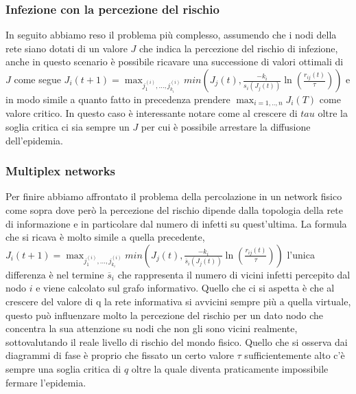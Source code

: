 \subsubsection{Infezione con la percezione del rischio}\label{subsubsec:infezione-con-la-percezione-del-rischio}
In seguito abbiamo reso il problema più complesso, assumendo che i nodi della rete siano dotati di 
un valore $J$ che indica la percezione del rischio di infezione, anche in questo scenario è possibile 
ricavare una successione di valori ottimali di $J$ come segue $J_{i}(t+1)=\max_{j^{(i)}_{1},...,j^{(i)}_{k_{i}}}min(J_{j}(t),\frac{-k_{i}}{s_{i}(J_{j}(t))}\ln(\frac{r_{ij}(t)}{\tau}))$ 
e in modo simile a quanto fatto in precedenza prendere $\max_{i= 1,..,n}J_{i}(T)$ come valore critico.
In questo caso è interessante notare come al crescere di $tau$ oltre la soglia critica ci sia sempre un 
$J$ per cui è possibile arrestare la diffusione dell'epidemia.
\subsubsection{Multiplex networks}\label{subsubsec:multiplex-networks}
Per finire abbiamo affrontato il problema della percolazione in un network fisico come sopra dove però la 
percezione del rischio dipende dalla topologia della rete di informazione e in particolare dal numero di
infetti su quest'ultima.
La formula che si ricava è molto simile a quella precedente, $J_{i}(t+1)=\max_{j^{(i)}_{1},...,j^{(i)}_{k_{i}}}min(J_{j}(t),\frac{-k_{i}}{\overline{s}_{i}(J_{j}(t))}\ln(\frac{r_{ij}(t)}{\tau}))$ 
l'unica differenza è nel termine $\overline{s}_{i}$ che rappresenta il numero di vicini infetti percepito
dal nodo $i$ e viene calcolato sul grafo informativo. Quello che ci si aspetta è che al crescere del valore di q
la rete informativa si avvicini sempre più a quella virtuale, questo può influenzare molto la percezione 
del rischio per un dato nodo che concentra la sua attenzione su nodi che non gli sono vicini realmente, 
sottovalutando il reale livello di rischio del mondo fisico. Quello che si osserva dai diagrammi di fase è
proprio che fissato un certo valore $\tau$ sufficientemente alto c'è sempre una soglia critica di $q$ 
oltre la quale diventa praticamente impossibile fermare l'epidemia.